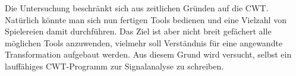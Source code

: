 Die Untersuchung beschränkt sich aus zeitlichen Gründen auf die CWT. Natürlich könnte man sich nun fertigen Tools bedienen und eine Vielzahl von Spielereien damit durchführen. Das Ziel ist aber nicht breit gefächert alle möglichen Tools anzuwenden, vielmehr soll Verständnis für eine angewandte Transformation aufgebaut werden. Aus diesem Grund wird versucht, selbst ein lauffähiges CWT-Programm zur Signalanalyse zu schreiben. 